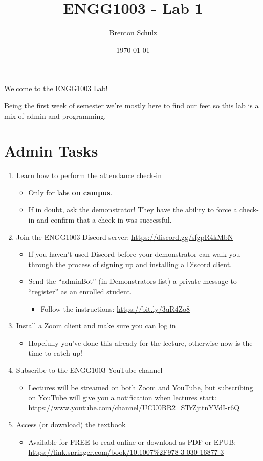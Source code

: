 \documentclass{lab}
\title{ENGG1003 - Lab 1}
\author{Brenton Schulz}
\date{\today}
\begin{document}
\maketitle

Welcome to the ENGG1003 Lab!

Being the first week of semester we're mostly here to find our feet so this lab is a mix of admin and programming.

\section{Admin Tasks}

\begin{enumerate}
\item Learn how to perform the attendance check-in
	\begin{itemize}
		\item Only for labs \textbf{on campus}.
		\item If in doubt, ask the demonstrator! They have the ability to force a check-in and confirm that a check-in was successful.
	\end{itemize}
\item Join the ENGG1003 Discord server: \url{https://discord.gg/sfgpR4kMbN}
	\begin{itemize}
		\item If you haven't used Discord before your demonstrator can walk you through the process of signing up and installing a Discord client.
		\item Send the ``adminBot'' (in Demonstrators list) a private message to ``register'' as an enrolled student.
			\begin{itemize}
				\item Follow the instructions: \url{https://bit.ly/3qR4Zo8}
			\end{itemize}
	\end{itemize}
\item Install a Zoom client and make sure you can log in
	\begin{itemize}
		\item Hopefully you've done this already for the lecture, otherwise now is the time to catch up!
	\end{itemize}
\item Subscribe to the ENGG1003 YouTube channel
	\begin{itemize}
		\item Lectures will be streamed on both Zoom and YouTube, but subscribing on YouTube will give you a notification when lectures start: \url{https://www.youtube.com/channel/UCU0BR2_STrZjttnYVdI-r6Q}
	\end{itemize}
\item Access (or download) the textbook
	\begin{itemize}
		\item Available for FREE to read online or download as PDF or EPUB: \url{https://link.springer.com/book/10.1007%2F978-3-030-16877-3}
	\end{itemize}
\end{enumerate}
\end{document}
